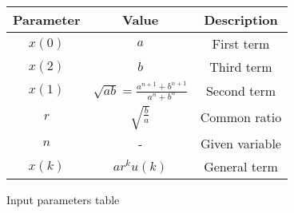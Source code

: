 \centering
\begin{tabular}{|c|c|c|}
        \hline
        \textbf{Parameter} & \textbf{Value} & \textbf{Description} \\
        \hline
	$x(0)$ & $a$ & First term \\
        \hline
	$x(2)$ & $b$ & Third term \\
	\hline
	$x(1)$ & $\sqrt{ab}=\frac{a^{n+1}+b^{n+1}}{a^{n}+b^{n}}$ & Second term\\
	\hline
	$r$ & $\sqrt{\frac{b}{a}}$ & Common ratio \\
	\hline
        $n$ & - & Given variable \\
        \hline
	$x(k)$ & $ar^{k}u(k)$ & General term \\
	\hline
\end{tabular}
\caption{Input parameters table}
\label{tab:11.9.3.27.1}
